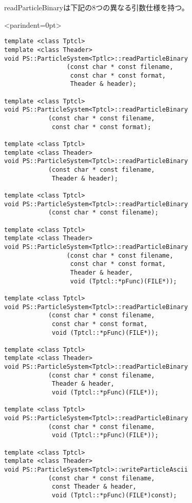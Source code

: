 \label{sec:readParticleBinary}

readParticleBinaryは下記の8つの異なる引数仕様を持つ。
\begin{breakitembox}<parindent=0pt>{}
\begin{verbatim}
template <class Tptcl>
template <class Theader>
void PS::ParticleSystem<Tptlc>::readParticleBinary
                 (const char * const filename,
                  const char * const format,
                  Theader & header);

template <class Tptcl>
void PS::ParticleSystem<Tptcl>::readParticleBinary
            (const char * const filename,
             const char * const format); 
             
template <class Tptcl>
template <class Theader>
void PS::ParticleSystem<Tptcl>::readParticleBinary
            (const char * const filename,
             Theader & header);

template <class Tptcl>
void PS::ParticleSystem<Tptcl>::readParticleBinary
            (const char * const filename);

template <class Tptcl>
template <class Theader>
void PS::ParticleSystem<Tptlc>::readParticleBinary
                 (const char * const filename,
                  const char * const format,
                  Theader & header,
                  void (Tptcl::*pFunc)(FILE*));
                 
template <class Tptcl>
void PS::ParticleSystem<Tptcl>::readParticleBinary
            (const char * const filename,
             const char * const format,
             void (Tptcl::*pFunc)(FILE*));

template <class Tptcl>
template <class Theader>
void PS::ParticleSystem<Tptcl>::readParticleBinary
            (const char * const filename,
             Theader & header,
             void (Tptcl::*pFunc)(FILE*));
             
template <class Tptcl>
void PS::ParticleSystem<Tptcl>::readParticleBinary
            (const char * const filename,
             void (Tptcl::*pFunc)(FILE*));

template <class Tptcl>
template <class Theader>
void PS::ParticleSystem<Tptcl>::writeParticleAscii
            (const char * const filename,
             const Theader & header,
             void (Tptcl::*pFunc)(FILE*)const);

\end{verbatim}
\end{breakitembox}

